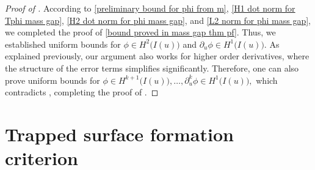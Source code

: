 \documentclass[11pt]{article}
\numberwithin{equation}{section}
\begin{document}
\begin{proof}[Proof of ]
According to \eqref{preliminary bound for phi from m}, \eqref{H1 dot norm for Tphi mass gap}, \eqref{H2 dot norm for phi mass gap}, and \eqref{L2 norm for phi mass gap}, we completed the proof of \eqref{bound proved in mass gap thm pf}. Thus, we established uniform bounds for $\phi\in H^{2}\big(I(u)\big)$ and $\partial_u\phi\in H^1\big(I(u)\big)$. As explained previously, our argument also works for higher order derivatives, where the structure of the error terms simplifies significantly. Therefore, one can also prove uniform bounds for $\phi\in H^{k+1}\big(I(u)\big),\ldots,\partial_u^{k}\phi\in H^1\big(I(u)\big),$ which contradicts , completing the proof of .
\end{proof}

\section{Trapped surface formation criterion}\label{trapped surface formation section}
\end{document}
